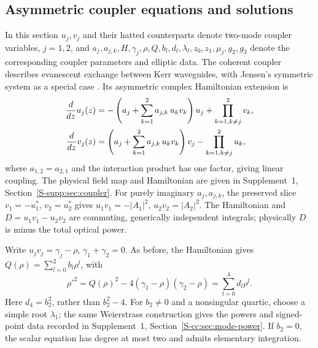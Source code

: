 \documentclass{optica-article}
\numberwithin{equation}{section}
\begin{document}
\subsection{Asymmetric coupler equations and solutions}\label{cc:sec:coupler}
In this section $u_j,v_j$ and their hatted counterparts denote two-mode coupler variables, $j=1,2$, and $a_j,a_{j,k},H,\gamma_j,\rho,Q,b_l,d_l,\lambda_l,z_0,z_1,\mu_j,g_2,g_3$ denote the corresponding coupler parameters and elliptic data.
The coherent coupler describes evanescent exchange between Kerr waveguides, with Jensen's symmetric system as a special case \cite{jensenNonlinearCoherentCoupler1982}.
Its asymmetric complex Hamiltonian extension is
\begin{align}
\frac{d}{d z} u_j{\left(z \right)} &= - \left({a}_{j} + \sum_{k=1}^{2} {a}_{j,k}\,u_k v_k \right) u_j + \prod\limits_{k=1, k \ne j}^{2} v_k, \notag \\
\frac{d}{d z} v_j{\left(z \right)} &= \left({a}_{j} + \sum_{k=1}^{2} {a}_{j,k}\,u_k v_k \right) v_j - \prod\limits_{k=1, k \ne j}^{2} u_k, \label{cc:eq:uv-system}
\end{align}
where $a_{1,2}=a_{2,1}$ and the interaction product has one factor, giving linear coupling.
The physical field map and Hamiltonian are given in Supplement~1, Section~\ref*{S-supp:sec:coupler}.
For purely imaginary $a_j,a_{j,k}$, the preserved slice $v_1=-u_1^*$, $v_2=u_2^*$ gives $u_1v_1=-|A_1|^2$, $u_2v_2=|A_2|^2$.
The Hamiltonian and $D=u_1v_1-u_2v_2$ are commuting, generically independent integrals; physically $D$ is minus the total optical power.

Write $u_jv_j=\gamma_j-\rho$, $\gamma_1+\gamma_2=0$.
As before, the Hamiltonian gives $Q(\rho)=\sum_{l=0}^2b_l\rho^l$, with
\begin{equation}
\rho'^2=Q(\rho)^2-4(\gamma_1-\rho)(\gamma_2-\rho)
=\sum_{l=0}^4d_l\rho^l.
\label{cc:eq:drho-sqrd-3}
\end{equation}
Here $d_4=b_2^2$, rather than $b_2^2-4$.
For $b_2\ne0$ and a nonsingular quartic, choose a simple root $\lambda_1$; the same Weierstrass construction gives the powers and signed-point data recorded in Supplement~1, Section~\ref*{S-cc:sec:mode-power}.
If $b_2=0$, the scalar equation has degree at most two and admits elementary integration.
\end{document}
